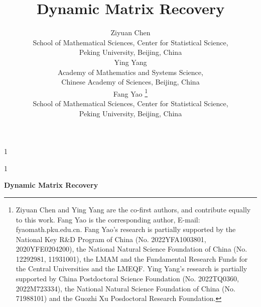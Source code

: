 \documentclass[12pt]{article}
\newcommand{\blind}{1}
\begin{document}
%

\def\spacingset#1{\renewcommand{\baselinestretch}%
{#1}\small\normalsize} \spacingset{1}



\blind
{
  \title{\bf Dynamic Matrix Recovery}
  \author{
  Ziyuan Chen\\    
    School of Mathematical Sciences, Center for Statistical Science, \\
    Peking University, Beijing, China\\ 
  Ying Yang\\
    Academy of Mathematics and Systems Science, \\ 
    Chinese Academy of Sciences, Beijing, China\\
    Fang Yao
     \thanks{
    Ziyuan Chen and Ying Yang are the co-first authors, and contribute equally to this work. Fang Yao is the corresponding author, E-mail: fyaomath.pku.edu.cn.  Fang Yao's research is partially supported by the National Key R\&D Program of China (No. 2022YFA1003801, 2020YFE0204200), the National Natural Science Foundation of China (No. 12292981, 11931001), the LMAM and the Fundamental Research Funds for the Central Universities and the LMEQF.  Ying Yang's research is partially supported by China Postdoctoral Science Foundation (No. 2022TQ0360, 2022M723334), the National Natural Science Foundation of China (No. 71988101) and the Guozhi Xu Posdoctoral Research Foundation.
       }\hspace{.2cm} 
    \\
    School of Mathematical Sciences, Center for Statistical Science, \\
    Peking University, Beijing, China\\ 
  }  
\date{}
\maketitle
} \fi

\blind
{
  \bigskip
  \bigskip
  \bigskip
  \begin{center}
    {\LARGE\bf Dynamic Matrix Recovery}
\end{center}
\date{}
\medskip
} \fi
\end{document}
